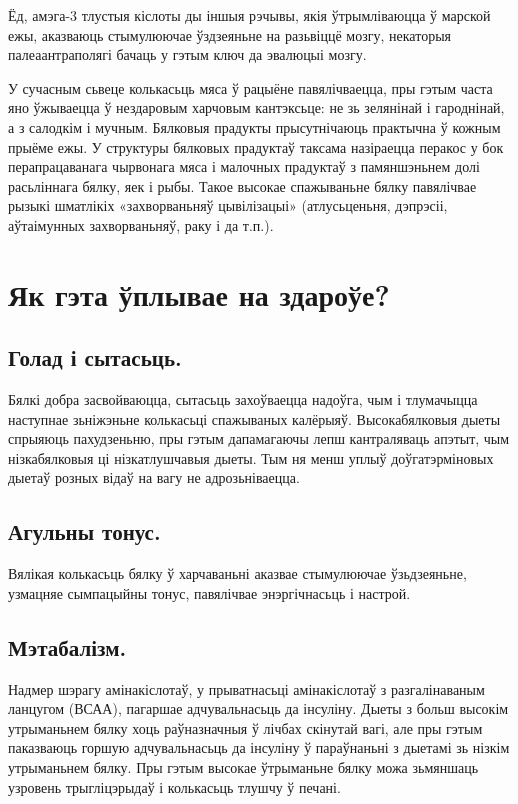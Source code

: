 Ёд, амэга-3 тлустыя кіслоты ды іншыя рэчывы, якія ўтрымліваюцца ў марской ежы, аказваюць стымулюючае ўздзеяньне на разьвіццё мозгу, некаторыя палеаантраполягі бачаць у гэтым ключ да эвалюцыі мозгу.

У сучасным сьвеце колькасьць мяса ў рацыёне павялічваецца, пры гэтым часта яно ўжываецца ў нездаровым харчовым кантэксьце: не зь зелянінай і гароднінай, а з салодкім і мучным. Бялковыя прадукты прысутнічаюць практычна ў кожным прыёме ежы. У структуры бялковых прадуктаў таксама назіраецца перакос у бок перапрацаванага чырвонага мяса і малочных прадуктаў з памяншэньнем долі расьліннага бялку, яек і рыбы. Такое высокае спажываньне бялку павялічвае рызыкі шматлікіх «захворваньняў цывілізацыі» (атлусьценьня, дэпрэсіі, аўтаімунных захворваньняў, раку і да т.п.).

\section{Як гэта ўплывае на здароўе?}

\subsection{Голад і сытасьць.}
Бялкі добра засвойваюцца, сытасьць захоўваецца надоўга, чым і тлумачыцца наступнае зьніжэньне колькасьці спажываных калёрыяў. Высокабялковыя дыеты спрыяюць пахудзеньню, пры гэтым дапамагаючы лепш кантраляваць апэтыт, чым нізкабялковыя ці нізкатлушчавыя дыеты. Тым ня менш уплыў доўгатэрміновых дыетаў розных відаў на вагу не адрозьніваецца.

\subsection{Агульны тонус.}
Вялікая колькасьць бялку ў харчаваньні аказвае стымулюючае ўзьдзеяньне, узмацняе сымпацыйны тонус, павялічвае энэргічнасьць і настрой.

\subsection{Мэтабалізм.}
Надмер шэрагу амінакіслотаў, у прыватнасьці амінакіслотаў з разгалінаваным ланцугом (ВСАА), пагаршае адчувальнасьць да інсуліну. Дыеты з больш высокім утрыманьнем бялку хоць раўназначныя ў лічбах скінутай вагі, але пры гэтым паказваюць горшую адчувальнасьць да інсуліну ў параўнаньні з дыетамі зь нізкім утрыманьнем бялку. Пры гэтым высокае ўтрыманьне бялку можа зьмяншаць узровень трыгліцэрыдаў і колькасьць тлушчу ў печані.

